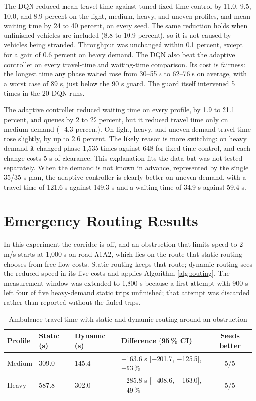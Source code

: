 The DQN reduced mean travel time against tuned fixed-time control by 11.0, 9.5, 10.0, and 8.9 percent on the light, medium, heavy, and uneven profiles, and mean waiting time by 24 to 40 percent, on every seed. The same reduction holds when unfinished vehicles are included (8.8 to 10.9 percent), so it is not caused by vehicles being stranded. Throughput was unchanged within 0.1 percent, except for a gain of 0.6 percent on heavy demand. The DQN also beat the adaptive controller on every travel-time and waiting-time comparison. Its cost is fairness: the longest time any phase waited rose from 30--55 s to 62--76 s on average, with a worst case of 89 s, just below the 90 s guard. The guard itself intervened 5 times in the 20 DQN runs.

The adaptive controller reduced waiting time on every profile, by 1.9 to 21.1 percent, and queues by 2 to 22 percent, but it reduced travel time only on medium demand ($-$4.3 percent). On light, heavy, and uneven demand travel time rose slightly, by up to 2.6 percent. The likely reason is more switching: on heavy demand it changed phase 1,535 times against 648 for fixed-time control, and each change costs 5 s of clearance. This explanation fits the data but was not tested separately. When the demand is not known in advance, represented by the single 35/35 s plan, the adaptive controller is clearly better on uneven demand, with a travel time of 121.6 s against 149.3 s and a waiting time of 34.9 s against 59.4 s.

\section{Emergency Routing Results}

In this experiment the corridor is off, and an obstruction that limits speed to 2 m/s starts at 1,000 s on road A1A2, which lies on the route that static routing chooses from free-flow costs. Static routing keeps that route; dynamic routing sees the reduced speed in its live costs and applies Algorithm \ref{alg:routing}. The measurement window was extended to 1,800 s because a first attempt with 900 s left four of five heavy-demand static trips unfinished; that attempt was discarded rather than reported without the failed trips.

\begin{table}[htbp]
\centering
\caption{Ambulance travel time with static and dynamic routing around an obstruction}
\label{tab:routing-results}
\begin{tabularx}{\textwidth}{p{}p{}p{}Yc}
\toprule
\textbf{Profile} & \textbf{Static (s)} & \textbf{Dynamic (s)} & \textbf{Difference (95\,\% CI)} & \textbf{Seeds better}\\
\midrule
Medium & 309.0 & 145.4 & $-$163.6 s [$-$201.7, $-$125.5], $-$53\,\% & 5/5\\
Heavy & 587.8 & 302.0 & $-$285.8 s [$-$408.6, $-$163.0], $-$49\,\% & 5/5\\
\bottomrule
\end{tabularx}
\end{table}

